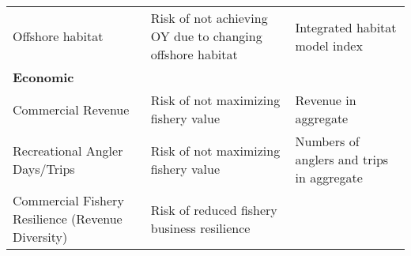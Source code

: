 \documentclass[11pt,]{article}
\begin{document}
\begin{longtable}[]{@{}lll@{}}
\begin{minipage}[t]{0.25\columnwidth}
Offshore habitat\strut
\end{minipage} & \begin{minipage}[t]{0.33\columnwidth}\raggedright\strut
Risk of not achieving OY due to changing offshore habitat\strut
\end{minipage} & \begin{minipage}[t]{0.33\columnwidth}\raggedright\strut
Integrated habitat model index\strut
\end{minipage}\tabularnewline
\begin{minipage}[t]{0.25\columnwidth}\raggedright\strut
\textbf{Economic}\strut
\end{minipage} & \begin{minipage}[t]{0.33\columnwidth}\raggedright\strut
\strut
\end{minipage} & \begin{minipage}[t]{0.33\columnwidth}\raggedright\strut
\strut
\end{minipage}\tabularnewline
\begin{minipage}[t]{0.25\columnwidth}\raggedright\strut
Commercial Revenue\strut
\end{minipage} & \begin{minipage}[t]{0.33\columnwidth}\raggedright\strut
Risk of not maximizing fishery value\strut
\end{minipage} & \begin{minipage}[t]{0.33\columnwidth}\raggedright\strut
Revenue in aggregate\strut
\end{minipage}\tabularnewline
\begin{minipage}[t]{0.25\columnwidth}\raggedright\strut
Recreational Angler Days/Trips\strut
\end{minipage} & \begin{minipage}[t]{0.33\columnwidth}\raggedright\strut
Risk of not maximizing fishery value\strut
\end{minipage} & \begin{minipage}[t]{0.33\columnwidth}\raggedright\strut
Numbers of anglers and trips in aggregate\strut
\end{minipage}\tabularnewline
\begin{minipage}[t]{0.25\columnwidth}\raggedright\strut
Commercial Fishery Resilience (Revenue Diversity)\strut
\end{minipage} & \begin{minipage}[t]{0.33\columnwidth}\raggedright\strut
Risk of reduced fishery business resilience\strut
\end{minipage} & \begin{minipage}[t]{0.33\columnwidth}\raggedright\strut

\end{minipage}
\end{longtable}
\end{document}
